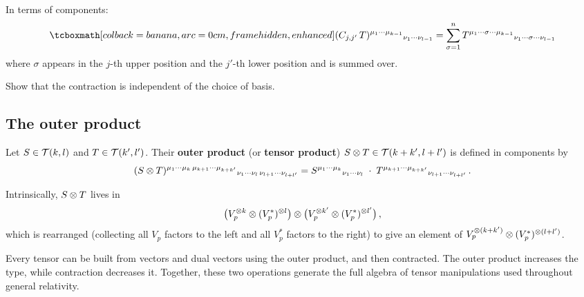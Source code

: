 \noindent
In terms of components:
\begin{equation}\label{eq:contraction-components}
  \eqbox{(C_{j,j'}\, T)^{\mu_1\cdots\mu_{k-1}}{}_{\nu_1\cdots\nu_{l-1}}
  = \sum_{\sigma=1}^{n}
    T^{\mu_1\cdots\sigma\cdots\mu_{k-1}}{}_{\nu_1\cdots\sigma\cdots\nu_{l-1}}}
\end{equation}
where $\sigma$ appears in the $j$-th upper position and the
$j'$-th lower position and is summed over.

\begin{exercise}\label{ex:contraction-basis-ind}
  Show that the contraction is independent of the choice of basis.
\end{exercise}

\subsection{The outer product}\label{sec:outer-product}

\begin{definition}\label{def:outer-product}
  Let $S\in\mathcal{T}(k,l)$ and $T\in\mathcal{T}(k',l')$.  Their
  \textbf{outer product} (or \textbf{tensor product})
  $S\otimes T \in \mathcal{T}(k+k',l+l')$ is defined in components by
  \begin{equation}\label{eq:outer-product}
    (S\otimes T)^{\mu_1\cdots\mu_k\,\mu_{k+1}\cdots\mu_{k+k'}}
             {}_{\nu_1\cdots\nu_l\,\nu_{l+1}\cdots\nu_{l+l'}}
    = S^{\mu_1\cdots\mu_k}{}_{\nu_1\cdots\nu_l}\;\cdot\;
      T^{\mu_{k+1}\cdots\mu_{k+k'}}{}_{\nu_{l+1}\cdots\nu_{l+l'}}\,.
  \end{equation}
\end{definition}

\noindent
Intrinsically, $S\otimes T$ lives in
\[
  \bigl(V_p^{\otimes k}\otimes (V_p^*)^{\otimes l}\bigr)
  \otimes
  \bigl(V_p^{\otimes k'}\otimes (V_p^*)^{\otimes l'}\bigr)\,,
\]
which is rearranged (collecting all $V_p$ factors to the left and
all $V_p^*$ factors to the right) to give an element of
$V_p^{\otimes(k+k')}\otimes (V_p^*)^{\otimes(l+l')}$.

\begin{intuition}
  Every tensor can be built from vectors and dual vectors using the
  outer product, and then contracted.  The outer product increases
  the type, while contraction decreases it.  Together, these two
  operations generate the full algebra of tensor manipulations used
  throughout general relativity.
\end{intuition}
